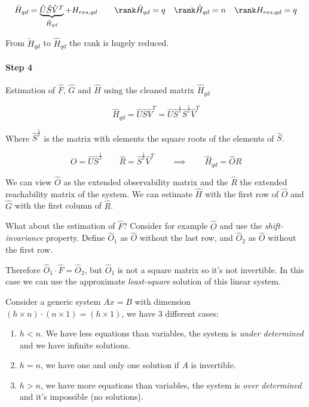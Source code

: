 \[
    \tilde{H}_{qd} = \underbrace{\hat{U} \hat{S} \hat{V}^T}_{\hat{H}_{qd}} + H_{res,qd} \qquad \rank \tilde{H}_{qd} = q \quad \rank \hat{H}_{qd} = n \quad \rank H_{res,qd} = q
\]

From $\tilde{H}_{qd}$ to $\hat{H}_{qd}$ the rank is hugely reduced.

\paragraph{Step 4} Estimation of $\hat{F}$, $\hat{G}$ and $\hat{H}$ using the cleaned matrix $\hat{H}_{qd}$

\[
    \hat{H}_{qd} = \hat{U} \hat{S} \hat{V}^T = \hat{U} \hat{S}^{\frac{1}{2}} \hat{S}^{\frac{1}{2}} \hat{V}^T
\]

Where $\hat{S}^{\frac{1}{2}}$ is the matrix with elements the square roots of the elements of $\hat{S}$.

\[
    \hat{O} = \hat{U} \hat{S}^{\frac{1}{2}} \qquad \hat{R} = \hat{S}^{\frac{1}{2}} \hat{V}^T \qquad \implies \qquad \hat{H}_{qd} = \hat{O} \hat{R}
\]

We can view $\hat{O}$ as the extended observability matrix and the $\hat{R}$ the extended reachability matrix of the system. We can estimate $\hat{H}$ with the first row of $\hat{O}$ and $\hat{G}$ with the first column of $\hat{R}$.

What about the estimation of $\hat{F}$?
Consider for example $\hat{O}$ and use the \emph{shift-invariance} property.
Define $\hat{O}_1$ as $\hat{O}$ without the last row, and $\hat{O}_2$ as $\hat{O}$ without the first row.

Therefore $\hat{O}_1\cdot \hat{F} = \hat{O}_2$, but $\hat{O}_1$ is not a square matrix so it's not invertible.
In this case we can use the approximate \emph{least-square} solution of this linear system.

Consider a generic system $Ax = B$ with dimension  $(h\times n) \cdot (n \times 1) = (h \times 1)$, we have 3 different cases:
\begin{enumerate}
    \item $h < n$. We have less equations than variables, the system is \emph{under determined} and we have infinite solutions.
    \item $h = n$, we have one and only one solution if $A$ is invertible.
    \item $h > n$, we have more equations than variables, the system is \emph{over determined} and it's impossible (no solutions).
\end{enumerate}

